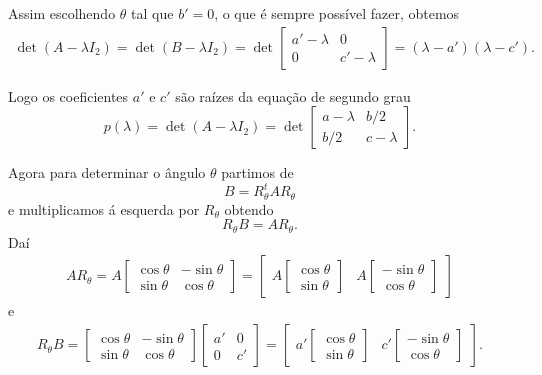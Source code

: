 Assim escolhendo $\theta$ tal que $b' = 0$, o que é sempre possível fazer, obtemos
\begin{align*}
  \det(A - \lambda I_2) = \det(B - \lambda I_2) = \det \begin{bmatrix}
    a' - \lambda & 0\\
    0 & c' - \lambda
  \end{bmatrix} = (\lambda - a')(\lambda - c').
\end{align*}

Logo os coeficientes $a'$ e $c'$ são raízes da equação de segundo grau
\begin{equation}
  p(\lambda) = \det(A - \lambda I_2) = \det \begin{bmatrix}
    a - \lambda & b/2\\
    b/2 & c - \lambda
  \end{bmatrix}.
\end{equation}

Agora para determinar o ângulo $\theta$ partimos de
\[
  B = R_\theta^t A R_\theta
\]
e multiplicamos á esquerda por $R_\theta$ obtendo
\[
  R_\theta B = AR_\theta.
\]
Daí
\begin{align*}
  AR_\theta = A \begin{bmatrix}
    \cos\theta & -\sin\theta\\
    \sin\theta & \cos\theta
  \end{bmatrix} = \begin{bmatrix}
    A \begin{bmatrix}
      \cos\theta \\ \sin\theta
    \end{bmatrix} & A \begin{bmatrix}
      -\sin\theta\\ \cos\theta
    \end{bmatrix}
  \end{bmatrix}
\end{align*}
e
\begin{align*}
  R_\theta B = \begin{bmatrix}
    \cos\theta & -\sin\theta\\
    \sin\theta & \cos\theta
  \end{bmatrix} \begin{bmatrix}
    a' & 0\\
    0 & c'
  \end{bmatrix} = \begin{bmatrix}
    a' \begin{bmatrix}
      \cos\theta \\ \sin\theta
    \end{bmatrix} & c' \begin{bmatrix}
      -\sin\theta\\ \cos\theta
    \end{bmatrix}
  \end{bmatrix}.
\end{align*}

